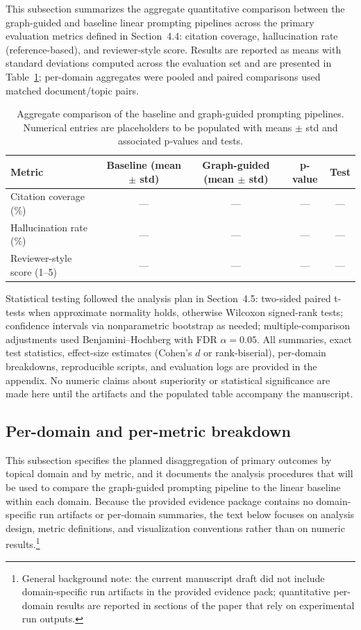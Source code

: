 \documentclass{article}%
\begin{document}
%
This subsection summarizes the aggregate quantitative comparison between the graph-guided and baseline linear prompting pipelines across the primary evaluation metrics defined in Section~4.4: citation coverage, hallucination rate (reference-based), and reviewer-style score.
Results are reported as means with standard deviations computed across the evaluation set and are presented in Table~\ref{tab:aggregate-results}; per-domain aggregates were pooled and paired comparisons used matched document/topic pairs.

\begin{table}[t]
\centering\small\begin{tabular}{lcccc}\toprule
Metric & Baseline (mean $\pm$ std) & Graph-guided (mean $\pm$ std) & p-value & Test \\ \midrule
Citation coverage (\%) & --- & --- & --- & --- \\ Hallucination rate (\%) & --- & --- & --- & --- \\ Reviewer-style score (1--5) & --- & --- & --- & --- \\ \bottomrule
\end{tabular}
\caption{Aggregate comparison of the baseline and graph-guided prompting pipelines. Numerical entries are placeholders to be populated with means $\pm$ std and associated p-values and tests.}\label{tab:aggregate-results}
\end{table}

Statistical testing followed the analysis plan in Section~4.5: two-sided paired t-tests when approximate normality holds, otherwise Wilcoxon signed-rank tests; confidence intervals via nonparametric bootstrap as needed; multiple-comparison adjustments used Benjamini--Hochberg with FDR $\alpha=0.05$.
All summaries, exact test statistics, effect-size estimates (Cohen's $d$ or rank-biserial), per-domain breakdowns, reproducible scripts, and evaluation logs are provided in the appendix. No numeric claims about superiority or statistical significance are made here until the artifacts and the populated table accompany the manuscript.%

%
\subsection{Per{-}domain and per{-}metric breakdown}%


%
This subsection specifies the planned disaggregation of primary outcomes by topical domain and by metric, and it documents the analysis procedures that will be used to compare the graph-guided prompting pipeline to the linear baseline within each domain. Because the provided evidence package contains no domain-specific run artifacts or per-domain summaries, the text below focuses on analysis design, metric definitions, and visualization conventions rather than on numeric results.\footnote{General background note: the current manuscript draft did not include domain-specific run artifacts in the provided evidence pack; quantitative per-domain results are reported in sections of the paper that rely on experimental run outputs.}
\end{document}
